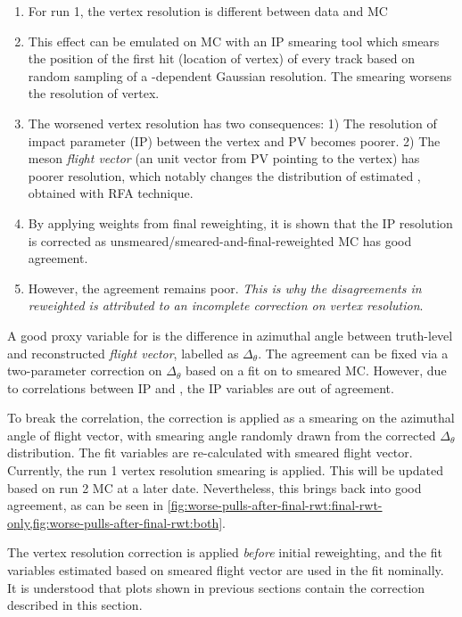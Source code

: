 \begin{enumerate}
    \item For run 1, the vertex resolution is different between data
        and MC
    \item This effect can be emulated on MC with an IP smearing tool which
        smears the position of the first hit (location of \B vertex) of every
        track based on random sampling of a \pt-dependent Gaussian resolution.
        The smearing worsens the resolution of \B vertex.
    \item The worsened \B vertex resolution has two consequences:
        1) The resolution of impact parameter (IP) between the \B vertex and PV
        becomes poorer.
        2) The \B meson \emph{flight vector}
        (an unit vector from PV pointing to the \B vertex) has poorer
        resolution,
        which notably changes the distribution of estimated \mmSq,
        obtained with RFA technique.
    \item By applying weights from final reweighting, it is shown that
        the IP resolution is corrected as unsmeared/smeared-and-final-reweighted
        MC has good agreement.
    \item However, the \mmSq agreement remains poor.
        \emph{This is why the disagreements in reweighted \mmSq is
        attributed to an incomplete correction on vertex resolution}.
\end{enumerate}

A good proxy variable for \mmSq is the difference in azimuthal angle
between truth-level and reconstructed \emph{flight vector},
labelled as $\Delta_\theta$.
The agreement can be fixed via a two-parameter correction on
$\Delta_\theta$ based on a fit on \mmSq to smeared MC.
However, due to correlations between IP and \mmSq, the IP variables are
out of agreement.

To break the correlation,
the correction is applied as a smearing on the azimuthal angle of \B
flight vector, with smearing angle randomly drawn from
the corrected $\Delta_\theta$ distribution.
The fit variables are re-calculated with smeared flight vector.
Currently, the run 1 vertex resolution smearing is applied.
This will be updated based on run 2 MC at a later date.
Nevertheless, this brings \mmSq back into good agreement, as can be seen in
\cref{fig:worse-pulls-after-final-rwt:final-rwt-only,fig:worse-pulls-after-final-rwt:both}.

The vertex resolution correction is applied \emph{before} initial reweighting,
and the fit variables estimated based on smeared flight vector are used
in the fit nominally.
It is understood that plots shown in previous sections contain the correction
described in this section.

